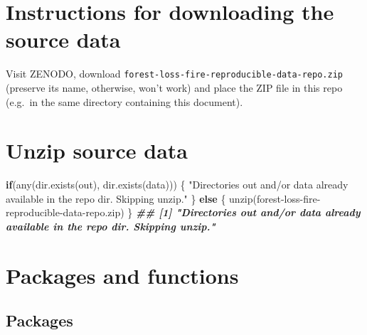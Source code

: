 \documentclass[10pt,landscape,a3paper]{article}
\newenvironment{Shaded}{\begin{snugshade}}{\end{snugshade}}
\newcommand{\ControlFlowTok}[1]{\textcolor[rgb]{0.13,0.29,0.53}{\textbf{#1}}}
\newcommand{\DocumentationTok}[1]{\textcolor[rgb]{0.56,0.35,0.01}{\textbf{\textit{#1}}}}
\newcommand{\FunctionTok}[1]{\textcolor[rgb]{0.00,0.00,0.00}{#1}}
\newcommand{\NormalTok}[1]{#1}
\newcommand{\StringTok}[1]{\textcolor[rgb]{0.31,0.60,0.02}{#1}}
\begin{document}
\hypertarget{instructions-for-downloading-the-source-data}{%
\section{Instructions for downloading the source
data}\label{instructions-for-downloading-the-source-data}}

Visit ZENODO, download
\texttt{forest-loss-fire-reproducible-data-repo.zip} (preserve its name,
otherwise, won't work) and place the ZIP file in this repo (e.g.~in the
same directory containing this document).

\hypertarget{unzip-source-data}{%
\section{Unzip source data}\label{unzip-source-data}}

\begin{Shaded}
\begin{Highlighting}[]
\ControlFlowTok{if}\NormalTok{(}\FunctionTok{any}\NormalTok{(}\FunctionTok{dir.exists}\NormalTok{(}\StringTok{\textquotesingle{}out\textquotesingle{}}\NormalTok{), }\FunctionTok{dir.exists}\NormalTok{(}\StringTok{\textquotesingle{}data\textquotesingle{}}\NormalTok{))) \{}
  \StringTok{"Directories \textquotesingle{}out\textquotesingle{} and/or \textquotesingle{}data\textquotesingle{} already available in the repo dir. Skipping unzip."}
\NormalTok{\} }\ControlFlowTok{else}\NormalTok{ \{}
  \FunctionTok{unzip}\NormalTok{(}\StringTok{\textquotesingle{}forest{-}loss{-}fire{-}reproducible{-}data{-}repo.zip\textquotesingle{}}\NormalTok{) }
\NormalTok{\}}
\DocumentationTok{\#\# [1] "Directories \textquotesingle{}out\textquotesingle{} and/or \textquotesingle{}data\textquotesingle{} already available in the repo dir. Skipping unzip."}
\end{Highlighting}
\end{Shaded}

\hypertarget{packages-and-functions}{%
\section{Packages and functions}\label{packages-and-functions}}

\hypertarget{packages}{%
\subsection{Packages}\label{packages}}
\end{document}
